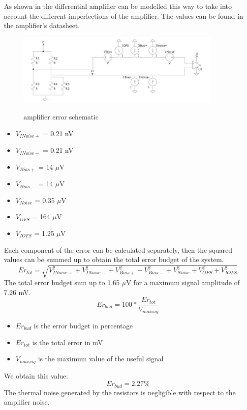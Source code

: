\documentclass{article}[12pt]
\begin{document}
As shown in \cite{Bucci-2020} the differential amplifier can be modelled this way to take into account the different imperfections of the amplifier.
The values can be found in the amplifier's datasheet.
\begin{figure}[H]
    \centering
    \includegraphics[width=0.9\textwidth]{figures/error_budget.pdf}
    \label{fig:error_budget}
    \caption{amplifier error schematic}
\end{figure}
\begin{itemize}
    \item $V_{INoise+}$ = 0.21 nV
    \item $V_{INoise-}$ = 0.21 nV
    \item $V_{Bias+}$ = 14 $\mu$V
    \item $V_{Bias-}$ = 14 $\mu$V
    \item $V_{Noise}$ = 0.35 $\mu$V
    \item $V_{OFS}$ = 164 $\mu$V
    \item $V_{IOFS}$ = 1.25 $\mu$V
\end{itemize}
Each component of the error can be calculated separately, then the squared values can be summed up to obtain the total error budget of the system.
\begin{equation}
    Er_{tot}=\sqrt{V_{INoise+}^2 + V_{INoise-}^2 + V_{Bias+}^2 + V_{Bias-}^2 + V_{Noise}^2 + V_{OFS}^2 + V_{IOFS}^2}
\end{equation}
The total error budget sum up to 1.65 $\mu$V for a maximum signal amplitude of 7.26 mV.
\begin{equation}
    Er_{bud}=100*\dfrac{Er_{tot}}{V_{maxsig}}
\end{equation}
\begin{itemize}
    \item $Er_{bud}$ is the error budget in percentage
    \item $Er_{tot}$ is the total error in mV
    \item $V_{maxsig}$ is the maximum value of the useful signal
\end{itemize}
We obtain this value:
\begin{equation}
    Er_{bud}=2.27\%
\end{equation}
The thermal noise generated by the resistors is negligible with respect to the amplifier noise.
\end{document}
